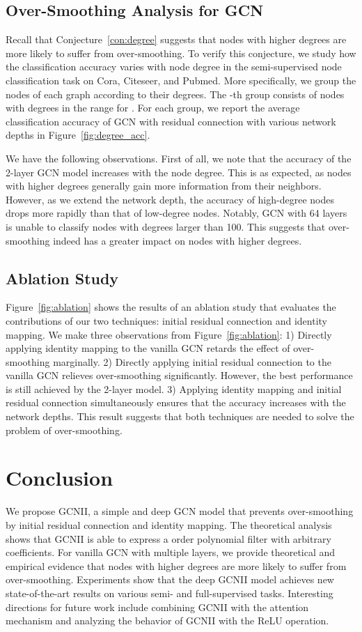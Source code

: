 \documentclass{article}
\begin{document}
\subsection{Over-Smoothing Analysis for GCN}
Recall that Conjecture~\ref{con:degree} suggests that nodes with higher degrees are
more likely to suffer from over-smoothing. To verify this conjecture,
we study how the classification accuracy varies with node degree in
the semi-supervised node classification task on Cora, Citeseer, and
Pubmed. More specifically, we group the nodes of
each graph according to their degrees. The -th group consists of
nodes with degrees in the range  for . For each group, we report the average classification accuracy
of GCN with residual connection with various network depths in
Figure~\ref{fig:degree_acc}.

We have the following observations.
First of all, we note that the
accuracy of the 2-layer GCN model increases with the node degree. This is as expected, as nodes with
higher degrees generally gain more information from their neighbors. However, as
we extend the network depth, the accuracy of high-degree nodes
drops more rapidly than that of low-degree nodes. Notably, GCN with 64
layers is unable to classify  nodes with degrees larger than 100. 
This suggests that over-smoothing indeed has a greater impact on nodes
with higher degrees. 


\subsection{Ablation Study}
Figure~\ref{fig:ablation} shows the results of an ablation study that evaluates the contributions
of our two techniques: initial residual connection and identity
mapping.  We make three observations from Figure~\ref{fig:ablation}:
1) Directly applying identity mapping to the vanilla GCN
retards the effect of over-smoothing marginally. 2) Directly applying initial
residual connection to the vanilla GCN relieves
over-smoothing significantly. However, the best performance is still achieved by the
2-layer model. 3) Applying identity mapping and initial residual
connection simultaneously ensures that  the accuracy increases with the
network depths. This result suggests that both techniques are needed
to solve the problem of over-smoothing.
 \section{Conclusion}
\label{sec:conclusion}
We propose GCNII, a simple and deep GCN model that prevents over-smoothing by initial residual connection and identity mapping.  The theoretical analysis shows that GCNII is able to express a  order polynomial filter with arbitrary coefficients.  For vanilla GCN with multiple layers,  we provide theoretical and empirical evidence that nodes with higher degrees are more likely to suffer from over-smoothing. Experiments show that the deep GCNII model achieves new state-of-the-art results on various semi- and full-supervised tasks. Interesting directions for future work include combining GCNII with the attention mechanism and analyzing the behavior of GCNII with the ReLU operation. 
 
\end{document}
